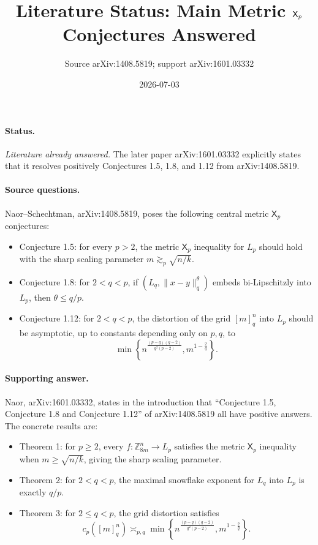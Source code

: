 \documentclass[11pt]{article}
\title{Literature Status: Main Metric \(\Xp\) Conjectures Answered}
\author{Source arXiv:1408.5819; support arXiv:1601.03332}
\date{2026-07-03}
\newcommand{\Z}{\mathbb{Z}}
\newcommand{\Xp}{\mathsf{X}_p}
\begin{document}
\maketitle

\paragraph{Status.}
\emph{Literature already answered.}  The later paper arXiv:1601.03332 explicitly states that it resolves positively Conjectures 1.5, 1.8, and 1.12 from arXiv:1408.5819.

\paragraph{Source questions.}
Naor--Schechtman, arXiv:1408.5819, poses the following central metric \(\Xp\) conjectures:
\begin{itemize}
\item Conjecture 1.5: for every \(p>2\), the metric \(\Xp\) inequality for \(L_p\) should hold with the sharp scaling parameter \(m\gtrsim_p \sqrt{n/k}\).
\item Conjecture 1.8: for \(2<q<p\), if \((L_q,\|x-y\|_q^\theta)\) embeds bi-Lipschitzly into \(L_p\), then \(\theta\le q/p\).
\item Conjecture 1.12: for \(2<q<p\), the distortion of the grid \([m]_q^n\) into \(L_p\) should be asymptotic, up to constants depending only on \(p,q\), to
\[
\min\left\{
n^{\frac{(p-q)(q-2)}{q^2(p-2)}},
m^{1-\frac{2}{q}}
\right\}.
\]
\end{itemize}

\paragraph{Supporting answer.}
Naor, arXiv:1601.03332, states in the introduction that ``Conjecture 1.5, Conjecture 1.8 and Conjecture 1.12'' of arXiv:1408.5819 all have positive answers.  The concrete results are:
\begin{itemize}
\item Theorem 1: for \(p\ge 2\), every \(f:\Z_{8m}^n\to L_p\) satisfies the metric \(\Xp\) inequality when \(m\ge \sqrt{n/k}\), giving the sharp scaling parameter.
\item Theorem 2: for \(2<q<p\), the maximal snowflake exponent for \(L_q\) into \(L_p\) is exactly \(q/p\).
\item Theorem 3: for \(2\le q<p\), the grid distortion satisfies
\[
c_p([m]_q^n)\asymp_{p,q}
\min\left\{
n^{\frac{(p-q)(q-2)}{q^2(p-2)}},
m^{1-\frac{2}{q}}
\right\}.
\]
\end{itemize}
\end{document}
